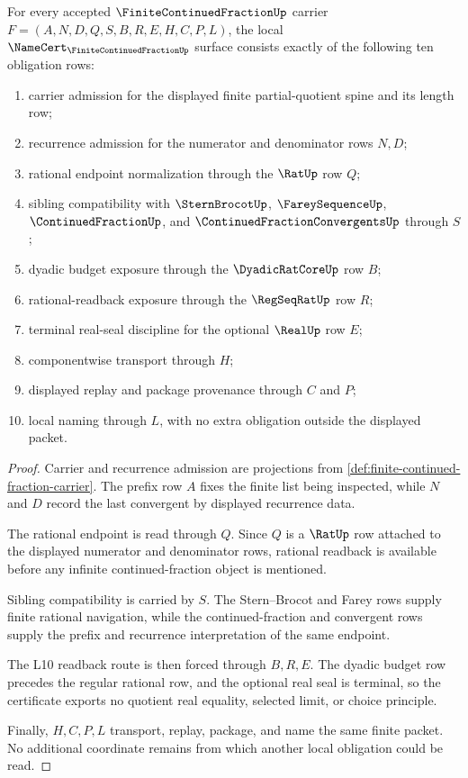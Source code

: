 \begin{theorem}
\label{thm:finite-continued-fraction-namecert-obligations}
For every accepted $\FiniteContinuedFractionUp$ carrier $F=(A,N,D,Q,S,B,R,E,H,C,P,L)$, the local $\NameCert_{\FiniteContinuedFractionUp}$ surface consists exactly of the following ten obligation rows:
\begin{enumerate}
\item carrier admission for the displayed finite partial-quotient spine and its length row;
\item recurrence admission for the numerator and denominator rows $N,D$;
\item rational endpoint normalization through the $\RatUp$ row $Q$;
\item sibling compatibility with $\SternBrocotUp$, $\FareySequenceUp$, $\ContinuedFractionUp$, and $\ContinuedFractionConvergentsUp$ through $S$;
\item dyadic budget exposure through the $\DyadicRatCoreUp$ row $B$;
\item rational-readback exposure through the $\RegSeqRatUp$ row $R$;
\item terminal real-seal discipline for the optional $\RealUp$ row $E$;
\item componentwise transport through $H$;
\item displayed replay and package provenance through $C$ and $P$;
\item local naming through $L$, with no extra obligation outside the displayed packet.
\end{enumerate}
\end{theorem}
\begin{proof}
Carrier and recurrence admission are projections from \autoref{def:finite-continued-fraction-carrier}. The prefix row $A$ fixes the finite list being inspected, while $N$ and $D$ record the last convergent by displayed recurrence data.

The rational endpoint is read through $Q$. Since $Q$ is a $\RatUp$ row attached to the displayed numerator and denominator rows, rational readback is available before any infinite continued-fraction object is mentioned.

Sibling compatibility is carried by $S$. The Stern--Brocot and Farey rows supply finite rational navigation, while the continued-fraction and convergent rows supply the prefix and recurrence interpretation of the same endpoint.

The L10 readback route is then forced through $B,R,E$. The dyadic budget row precedes the regular rational row, and the optional real seal is terminal, so the certificate exports no quotient real equality, selected limit, or choice principle.

Finally, $H,C,P,L$ transport, replay, package, and name the same finite packet. No additional coordinate remains from which another local obligation could be read.
\end{proof}

